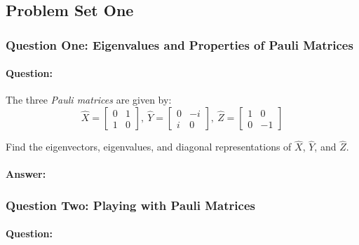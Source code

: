 \documentclass[reprint, amsmath,amssymb, aps]{revtex4-2}
\begin{document}
        \subsection{Problem Set One}
            \subsubsection{Question One: Eigenvalues and Properties of Pauli Matrices}
                \paragraph{Question:}
                
                The three \textit{Pauli matrices} are given by:
                \begin{equation*}
                    \hat{X} = \begin{bmatrix}0 & 1 \\1 & 0\end{bmatrix}, \
                    \hat{Y} = \begin{bmatrix}0 & -i \\i & 0\end{bmatrix}, \
                    \hat{Z} = \begin{bmatrix}1 & 0 \\0 & -1\end{bmatrix}
                \end{equation*}

                Find the eigenvectors, eigenvalues, and diagonal representations of $\hat{X}$, $\hat{Y}$, and $\hat{Z}$.

                \begin{mdframed}
                    \paragraph{Answer:}

                    
                \end{mdframed}
                
            \subsubsection{Question Two: Playing with Pauli Matrices}
                \paragraph{Question:}
                
\end{document}
